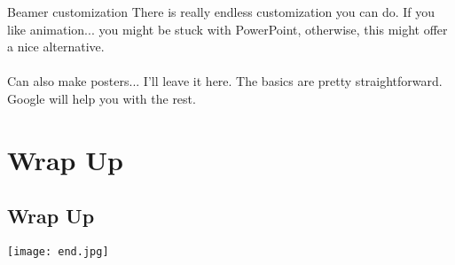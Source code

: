\documentclass[xcolor=dvipsnames]{beamer}
\begin{document}
\begin{frame}{Beamer customization}
There is really endless customization you can do. If you like animation... you might be stuck with PowerPoint, otherwise, this might offer a nice alternative. \\~\\

Can also make posters... I'll leave it here. The basics are pretty straightforward. Google will help you with the rest.
\end{frame}

\section{Wrap Up}
\subsection{Wrap Up}
\begin{frame}
\texttt{[image: end.jpg]}
\end{frame}
\end{document}
